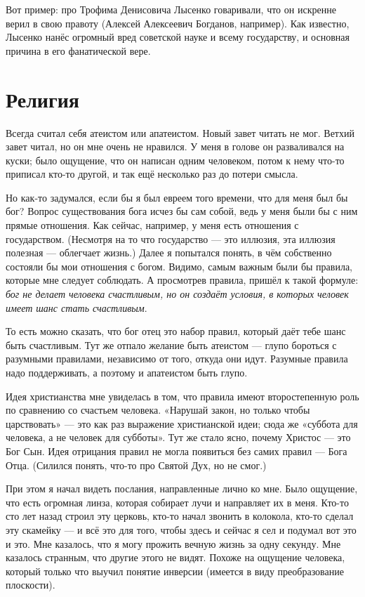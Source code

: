\documentclass{book}
\begin{document}
Вот пример: про Трофима Денисовича Лысенко говаривали, что он искренне верил в свою правоту (Алексей Алексеевич Богданов, например).
Как известно, Лысенко нанёс огромный вред советской науке и всему государству, и основная причина в его фанатической вере.

\section*{Религия}

Всегда считал себя атеистом или апатеистом.
Новый завет читать не мог.
Ветхий завет читал, но он мне очень не нравился.
У меня в голове он разваливался на куски; было ощущение, что он написан одним человеком, потом к нему что-то приписал кто-то другой, и так ещё несколько раз до потери смысла.

Но как-то задумался, если бы я был евреем того времени, что для меня был бы бог?
Вопрос существования бога исчез бы сам собой, ведь у меня были бы с ним прямые отношения.
Как сейчас, например, у меня есть отношения с государством. 
(Несмотря на то что государство --- это иллюзия, эта иллюзия полезная --- облегчает жизнь.)
Далее я попытался понять, в чём собственно состояли бы мои отношения с богом.
Видимо, самым важным были бы правила, которые мне следует соблюдать.
А просмотрев правила, пришёл к такой формуле: \emph{бог не делает человека счастливым, но он создаёт условия, в которых человек имеет шанс стать счастливым}.

То есть можно сказать, что бог отец это набор правил, который даёт тебе шанс быть счастливым.
Тут же отпало желание быть атеистом --- глупо бороться с разумными правилами, независимо от того, откуда они идут.
Разумные правила надо поддерживать, а поэтому и апатеистом быть глупо.

Идея христианства мне увиделась в том, что правила имеют второстепенную роль по сравнению со счастьем человека.
«Нарушай закон, но только чтобы царствовать» --- это как раз выражение христианской идеи;
сюда же «суббота для человека, а не человек для субботы».
Тут же стало ясно, почему Христос --- это Бог Сын.
Идея отрицания правил не могла появиться без самих правил --- Бога Отца.
(Силился понять, что-то про Святой Дух, но не смог.)

При этом я начал видеть послания, направленные лично ко мне.
Было ощущение, что есть огромная линза, которая собирает лучи и направляет их в меня.
Кто-то сто лет назад строил эту церковь, кто-то начал звонить в колокола, кто-то сделал эту скамейку --- и всё это для того, чтобы здесь и сейчас я сел и подумал вот это и это.
Мне казалось, что я могу прожить вечную жизнь за одну секунду.
Мне казалось странным, что другие этого не видят.
Похоже на ощущение человека, который только что выучил понятие инверсии (имеется в виду преобразование плоскости).
\end{document}
